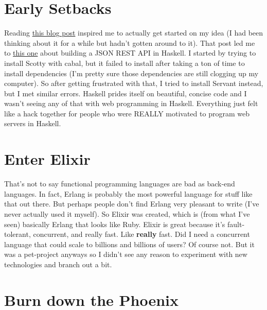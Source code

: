\documentclass[12pt]{article}
\begin{document}
  \section{Early Setbacks}

  Reading \href{http://taylor.fausak.me/2015/08/23/type-safe-web-services-in-haskell-with-servant/}{this blog post} inspired me to actually get started on my idea (I had been thinking about it for a while but hadn't gotten around to it). That post led me to \href{http://taylor.fausak.me/2014/10/21/building-a-json-rest-api-in-haskell/}{this one} about building a JSON REST API in Haskell. I started by trying to install Scotty with cabal, but it failed to install after taking a ton of time to install dependencies (I'm pretty sure those dependencies are still clogging up my computer). So after getting frustrated with that, I tried to install Servant instead, but I met similar errors. Haskell prides itself on beautiful, concise code and I wasn't seeing any of that with web programming in Haskell. Everything just felt like a hack together for people who were REALLY motivated to program web servers in Haskell. 

  \section{Enter Elixir}

  That's not to say functional programming languages are bad as back-end languages. In fact, Erlang is probably the most powerful language for stuff like that out there. But perhaps people don't find Erlang very pleasant to write (I've never actually used it myself). So Elixir was created, which is (from what I've seen) basically Erlang that looks like Ruby. Elixir is great because it's fault-tolerant, concurrent, and really fast. Like \textbf{really} fast. Did I need a concurrent language that could scale to billions and billions of users? Of course not. But it was a pet-project anyways so I didn't see any reason to experiment with new technologies and branch out a bit. 

  \section{Burn down the Phoenix}
\end{document}
